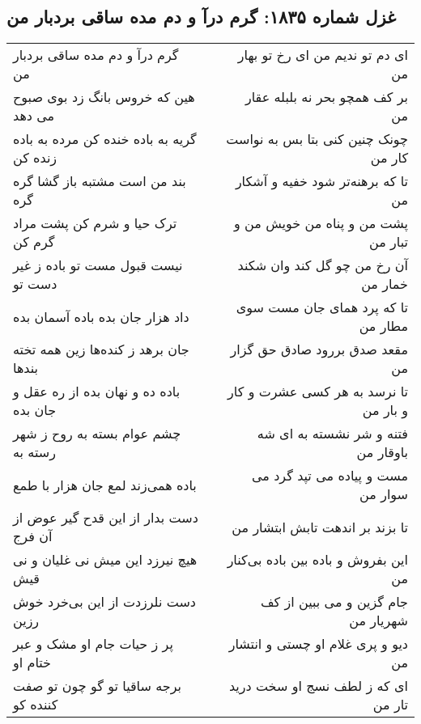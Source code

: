 \begin{center}
\section*{غزل شماره ۱۸۳۵: گرم درآ و دم مده ساقی بردبار من}
\label{sec:1835}
\begin{longtable}{l p{0.5cm} r}
گرم درآ و دم مده ساقی بردبار من
&&
ای دم تو ندیم من ای رخ تو بهار من
\\
هین که خروس بانگ زد بوی صبوح می دهد
&&
بر کف همچو بحر نه بلبله عقار من
\\
گریه به باده خنده کن مرده به باده زنده کن
&&
چونک چنین کنی بتا بس به نواست کار من
\\
بند من است مشتبه باز گشا گره گره
&&
تا که برهنه‌تر شود خفیه و آشکار من
\\
ترک حیا و شرم کن پشت مراد گرم کن
&&
پشت من و پناه من خویش من و تبار من
\\
نیست قبول مست تو باده ز غیر دست تو
&&
آن رخ من چو گل کند وان شکند خمار من
\\
داد هزار جان بده باده آسمان بده
&&
تا که پرد همای جان مست سوی مطار من
\\
جان برهد ز کنده‌ها زین همه تخته بندها
&&
مقعد صدق بررود صادق حق گزار من
\\
باده ده و نهان بده از ره عقل و جان بده
&&
تا نرسد به هر کسی عشرت و کار و بار من
\\
چشم عوام بسته به روح ز شهر رسته به
&&
فتنه و شر نشسته به ای شه باوقار من
\\
باده همی‌زند لمع جان هزار با طمع
&&
مست و پیاده می تپد گرد می سوار من
\\
دست بدار از این قدح گیر عوض از آن فرج
&&
تا بزند بر اندهت تابش ابتشار من
\\
هیچ نیرزد این میش نی غلیان و نی قیش
&&
این بفروش و باده بین باده بی‌کنار من
\\
دست نلرزدت از این بی‌خرد خوش رزین
&&
جام گزین و می ببین از کف شهریار من
\\
پر ز حیات جام او مشک و عبر ختام او
&&
دیو و پری غلام او چستی و انتشار من
\\
برجه ساقیا تو گو چون تو صفت کننده کو
&&
ای که ز لطف نسج او سخت درید تار من
\\
\end{longtable}
\end{center}
